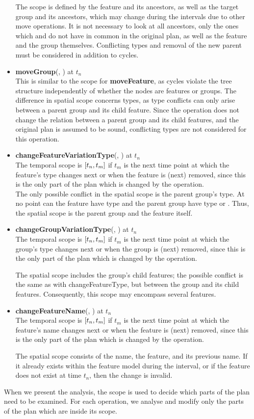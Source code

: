 \begin{itemize}
  The scope is defined by the feature and its ancestors, as well as the target group and its ancestors, which may change during the intervals due to other move operations. It is not necessary to look at all ancestors, only the ones which  and  do not have in common in the original plan, as well as the feature and the group themselves. Conflicting types and removal of the new parent must be considered in addition to cycles.
  \item \textbf{moveGroup}(, ) at $t_n$\\
    This is similar to the scope for \textbf{moveFeature}, as cycles violate the tree structure independently of whether the nodes are features or groups.
    The difference in spatial scope concerns types, as type conflicts can only arise between a parent group and its child feature. Since the operation does not change the relation between a parent group and its child features, and the original plan is assumed to be sound, conflicting types are not considered for this operation.
  \item \textbf{changeFeatureVariationType}(, ) at $t_n$\\
    The temporal scope is $\interval{t_n}{t_m}$ if $t_m$ is the next time point at which the feature's type changes next or when the feature is (next) removed, since this is the only part of the plan which is changed by the operation.\\
    The only possible conflict in the spatial scope is the parent group's type. At no point can the feature have type \mandatory{} and the parent group have type \xortype{} or \ortype{}. Thus, the spatial scope is the parent group and the feature itself.\\
  \item \textbf{changeGroupVariationType}(, ) at $t_n$\\
    The temporal scope is $\interval{t_n}{t_m}$ if $t_m$ is the next time point at which the group's type changes next or when the group is (next) removed, since this is the only part of the plan which is changed by the operation.

    The spatial scope includes the group's child features; the possible conflict is the same as with changeFeatureType, but between the group and its child features. Consequently, this scope may encompass several features.\\
  \item \textbf{changeFeatureName}(, ) at $t_n$\\
  The temporal scope is $\interval{t_n}{t_m}$ if $t_m$ is the next time point at which the feature's name changes next or when the feature is (next) removed, since this is the only part of the plan which is changed by the operation.

    The spatial scope consists of the name, the feature, and its previous name. If it already exists within the feature model during the interval, or if the feature does not exist at time $t_n$, then the change is invalid. 
\end{itemize}

When we present the analysis, the scope is used to decide which parts of the plan need to be examined. For each operation, we analyse and modify only the parts of the plan which are inside its scope.


